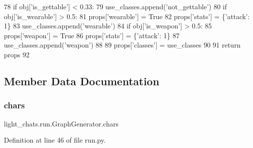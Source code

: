 \begin{DoxyCode}
78         \textcolor{keywordflow}{if} obj[\textcolor{stringliteral}{'is\_gettable'}] < 0.33:
79             use\_classes.append(\textcolor{stringliteral}{'not\_gettable'})
80         \textcolor{keywordflow}{if} obj[\textcolor{stringliteral}{'is\_wearable'}] > 0.5:
81             props[\textcolor{stringliteral}{'wearable'}] = \textcolor{keyword}{True}
82             props[\textcolor{stringliteral}{'stats'}] = \{\textcolor{stringliteral}{'attack'}: 1\}
83             use\_classes.append(\textcolor{stringliteral}{'wearable'})
84         \textcolor{keywordflow}{if} obj[\textcolor{stringliteral}{'is\_weapon'}] > 0.5:
85             props[\textcolor{stringliteral}{'weapon'}] = \textcolor{keyword}{True}
86             props[\textcolor{stringliteral}{'stats'}] = \{\textcolor{stringliteral}{'attack'}: 1\}
87             use\_classes.append(\textcolor{stringliteral}{'weapon'})
88 
89         props[\textcolor{stringliteral}{'classes'}] = use\_classes
90 
91         \textcolor{keywordflow}{return} props
92 
\end{DoxyCode}


\subsection{Member Data Documentation}
\mbox{\label{classlight__chats_1_1run_1_1GraphGenerator_a3a7d4254e7381805d70735c33110e488}} 
\subsubsection{\texorpdfstring{chars}{chars}}
{\footnotesize\ttfamily light\+\_\+chats.\+run.\+Graph\+Generator.\+chars}



Definition at line 46 of file run.\+py.

\mbox{\label{classlight__chats_1_1run_1_1GraphGenerator_adb64c1437325f8797b0d6a7cdd9d6692}} 
